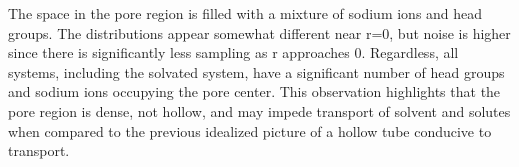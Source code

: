 \documentclass[journal=jpcbfk,manuscript=article]{achemso}
\begin{document}

  The space in the pore region is filled with a mixture of sodium ions
  and head groups. The distributions appear somewhat different near r=0, but noise 
  is higher since there is significantly less sampling as r approaches 0. Regardless, 
  all systems, including the solvated system, have a significant number of head groups 
  and sodium ions occupying the pore center. This observation highlights that the pore
  region is dense, not hollow, and may impede transport of solvent and solutes when
  compared to the previous idealized picture of a hollow tube conducive to transport.
  
\end{document}
